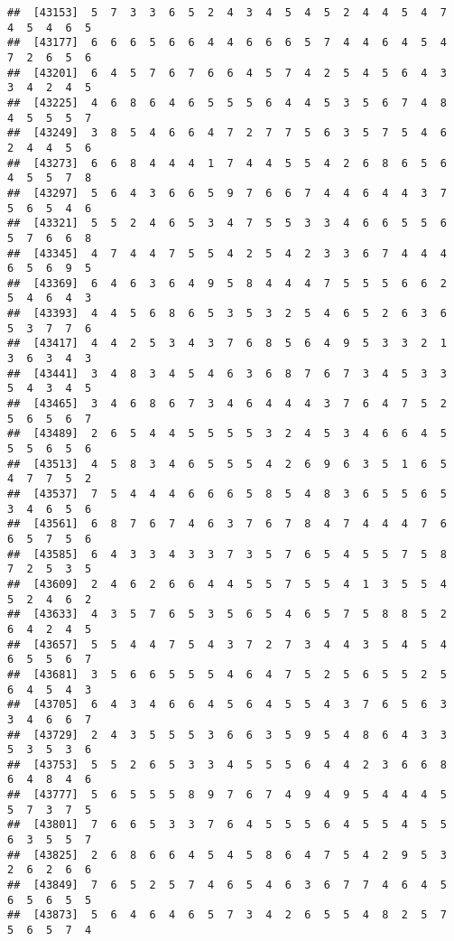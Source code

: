 \documentclass[
]{book}
\begin{document}
\begin{verbatim}
##  [43153]  5  7  3  3  6  5  2  4  3  4  5  4  5  2  4  4  5  4  7  4  5  4  6  5
##  [43177]  6  6  6  5  6  6  4  4  6  6  6  5  7  4  4  6  4  5  4  7  2  6  5  6
##  [43201]  6  4  5  7  6  7  6  6  4  5  7  4  2  5  4  5  6  4  3  3  4  2  4  5
##  [43225]  4  6  8  6  4  6  5  5  5  6  4  4  5  3  5  6  7  4  8  4  5  5  5  7
##  [43249]  3  8  5  4  6  6  4  7  2  7  7  5  6  3  5  7  5  4  6  2  4  4  5  6
##  [43273]  6  6  8  4  4  4  1  7  4  4  5  5  4  2  6  8  6  5  6  4  5  5  7  8
##  [43297]  5  6  4  3  6  6  5  9  7  6  6  7  4  4  6  4  4  3  7  5  6  5  4  6
##  [43321]  5  5  2  4  6  5  3  4  7  5  5  3  3  4  6  6  5  5  6  5  7  6  6  8
##  [43345]  4  7  4  4  7  5  5  4  2  5  4  2  3  3  6  7  4  4  4  6  5  6  9  5
##  [43369]  6  4  6  3  6  4  9  5  8  4  4  4  7  5  5  5  6  6  2  5  4  6  4  3
##  [43393]  4  4  5  6  8  6  5  3  5  3  2  5  4  6  5  2  6  3  6  5  3  7  7  6
##  [43417]  4  4  2  5  3  4  3  7  6  8  5  6  4  9  5  3  3  2  1  3  6  3  4  3
##  [43441]  3  4  8  3  4  5  4  6  3  6  8  7  6  7  3  4  5  3  3  5  4  3  4  5
##  [43465]  3  4  6  8  6  7  3  4  6  4  4  4  3  7  6  4  7  5  2  5  6  5  6  7
##  [43489]  2  6  5  4  4  5  5  5  5  3  2  4  5  3  4  6  6  4  5  5  5  6  5  6
##  [43513]  4  5  8  3  4  6  5  5  5  4  2  6  9  6  3  5  1  6  5  4  7  7  5  2
##  [43537]  7  5  4  4  4  6  6  6  5  8  5  4  8  3  6  5  5  6  5  3  4  6  5  6
##  [43561]  6  8  7  6  7  4  6  3  7  6  7  8  4  7  4  4  4  7  6  6  5  7  5  6
##  [43585]  6  4  3  3  4  3  3  7  3  5  7  6  5  4  5  5  7  5  8  7  2  5  3  5
##  [43609]  2  4  6  2  6  6  4  4  5  5  7  5  5  4  1  3  5  5  4  5  2  4  6  2
##  [43633]  4  3  5  7  6  5  3  5  6  5  4  6  5  7  5  8  8  5  2  6  4  2  4  5
##  [43657]  5  5  4  4  7  5  4  3  7  2  7  3  4  4  3  5  4  5  4  6  5  5  6  7
##  [43681]  3  5  6  6  5  5  5  4  6  4  7  5  2  5  6  5  5  2  5  6  4  5  4  3
##  [43705]  6  4  3  4  6  6  4  5  6  4  5  5  4  3  7  6  5  6  3  3  4  6  6  7
##  [43729]  2  4  3  5  5  5  3  6  6  3  5  9  5  4  8  6  4  3  3  5  3  5  3  6
##  [43753]  5  5  2  6  5  3  3  4  5  5  5  6  4  4  2  3  6  6  8  6  4  8  4  6
##  [43777]  5  6  5  5  5  8  9  7  6  7  4  9  4  9  5  4  4  4  5  5  7  3  7  5
##  [43801]  7  6  6  5  3  3  7  6  4  5  5  5  6  4  5  5  4  5  5  6  3  5  5  7
##  [43825]  2  6  8  6  6  4  5  4  5  8  6  4  7  5  4  2  9  5  3  2  6  2  6  6
##  [43849]  7  6  5  2  5  7  4  6  5  4  6  3  6  7  7  4  6  4  5  6  5  6  5  5
##  [43873]  5  6  4  6  4  6  5  7  3  4  2  6  5  5  4  8  2  5  7  5  6  5  7  4

\end{verbatim}
\end{document}
